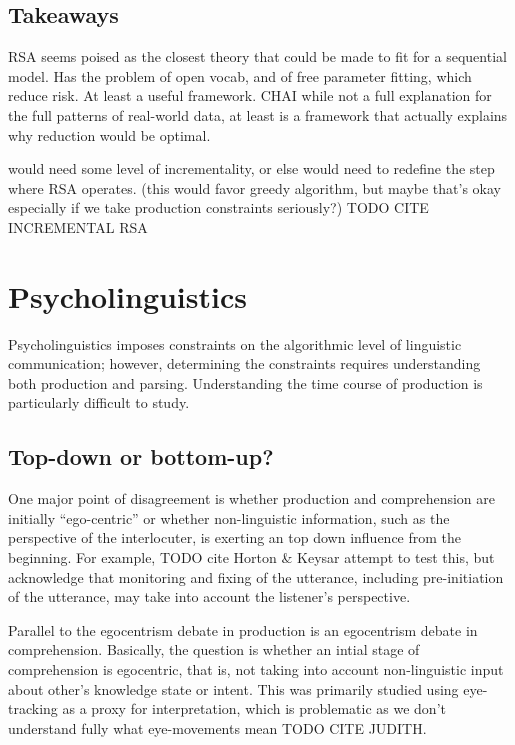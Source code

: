 \documentclass[]{article}
\begin{document}
\subsection{Takeaways}
RSA seems poised as the closest theory that could be made to fit for a sequential model. Has the problem of open vocab, and of free parameter fitting, which reduce risk. At least a useful framework. 
CHAI while not a full explanation for the full patterns of real-world data, at least is a framework that actually explains why reduction would be optimal. 

would need some level of incrementality, or else would need to redefine the step where RSA operates. (this would favor greedy algorithm, but maybe that's okay especially if we take production constraints seriously?)
TODO CITE INCREMENTAL RSA

\section{Psycholinguistics}

Psycholinguistics imposes constraints on the algorithmic level of linguistic communication; however, determining the constraints requires understanding both production and parsing. Understanding the time course of production is particularly difficult to study. 

\subsection{Top-down or bottom-up?}
One major point of disagreement is whether production and comprehension are initially ``ego-centric'' or whether non-linguistic information, such as the perspective of the interlocuter, is exerting an top down influence from the beginning. For example, TODO cite Horton \& Keysar attempt to test this, but acknowledge that monitoring and fixing of the utterance, including pre-initiation of the utterance, may take into account the listener's perspective. %

Parallel to the egocentrism debate in production is an egocentrism debate in comprehension. Basically, the question is whether an intial stage of comprehension is egocentric, that is, not taking into account non-linguistic input about other's knowledge state or intent. This was primarily studied using eye-tracking as a proxy for interpretation, which is problematic as we don't understand fully what eye-movements mean TODO CITE JUDITH. 
\end{document}
